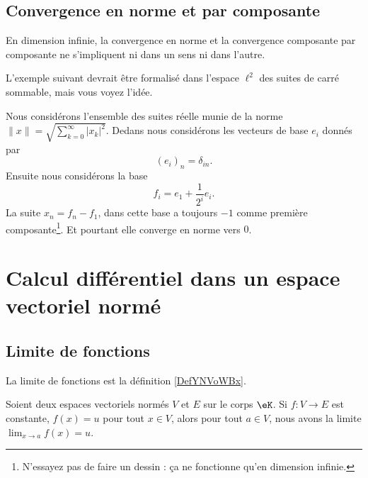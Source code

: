 \subsection{Convergence en norme et par composante}

En dimension infinie, la convergence en norme et la convergence composante par composante ne s'impliquent ni dans un sens ni dans l'autre.

L'exemple suivant devrait être formalisé dans l'espace \( \ell^2\) des suites de carré sommable, mais vous voyez l'idée.
\begin{example}
	Nous considérons l'ensemble des suites réelle munie de la norme \( \| x \|=\sqrt{ \sum_{k=0}^{\infty}| x_k |^2 } \). Dedans nous considérons les vecteurs de base \( e_i\) donnés par
	\begin{equation}
		(e_i)_n=\delta_{in}.
	\end{equation}
	Ensuite nous considérons la base
	\begin{equation}
		f_i=e_1+\frac{1}{ 2^i }e_i.
	\end{equation}
	La suite \( x_n=f_n-f_1\), dans cette base a toujours \( -1\) comme première composante\footnote{N'essayez pas de faire un dessin : ça ne fonctionne qu'en dimension infinie.}. Et pourtant elle converge en norme vers \( 0\).
\end{example}

\section{Calcul différentiel dans un espace vectoriel normé}

\subsection{Limite de fonctions}

La limite de fonctions est la définition \ref{DefYNVoWBx}.

\begin{lemma}		\label{LEMooTFLVooMMNmQr}
	Soient deux espaces vectoriels normés \( V\) et \( E\) sur le corps \( \eK\). Si \(f \colon V\to E  \) est constante, \( f(x)=u\) pour tout \( x\in V\), alors pour tout \( a\in V\), nous avons la limite \( \lim_{x\to a}f(x)=u\).
\end{lemma}

